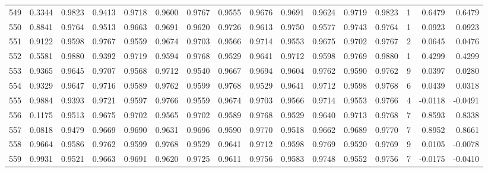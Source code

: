 \begin{tabular}{lrrrrrrrrrrrrrrr}
549 &      0.3344 &  0.9823 &  0.9413 &  0.9718 &  0.9600 &  0.9767 &  0.9555 &  0.9676 &  0.9691 &  0.9624 &   0.9719 &     0.9823 &      1 &                    0.6479 &                     0.6479 \\
550 &      0.8841 &  0.9764 &  0.9513 &  0.9663 &  0.9691 &  0.9620 &  0.9726 &  0.9613 &  0.9750 &  0.9577 &   0.9743 &     0.9764 &      1 &                    0.0923 &                     0.0923 \\
551 &      0.9122 &  0.9598 &  0.9767 &  0.9559 &  0.9674 &  0.9703 &  0.9566 &  0.9714 &  0.9553 &  0.9675 &   0.9702 &     0.9767 &      2 &                    0.0645 &                     0.0476 \\
552 &      0.5581 &  0.9880 &  0.9392 &  0.9719 &  0.9594 &  0.9768 &  0.9529 &  0.9641 &  0.9712 &  0.9598 &   0.9769 &     0.9880 &      1 &                    0.4299 &                     0.4299 \\
553 &      0.9365 &  0.9645 &  0.9707 &  0.9568 &  0.9712 &  0.9540 &  0.9667 &  0.9694 &  0.9604 &  0.9762 &   0.9590 &     0.9762 &      9 &                    0.0397 &                     0.0280 \\
554 &      0.9329 &  0.9647 &  0.9716 &  0.9589 &  0.9762 &  0.9599 &  0.9768 &  0.9529 &  0.9641 &  0.9712 &   0.9598 &     0.9768 &      6 &                    0.0439 &                     0.0318 \\
555 &      0.9884 &  0.9393 &  0.9721 &  0.9597 &  0.9766 &  0.9559 &  0.9674 &  0.9703 &  0.9566 &  0.9714 &   0.9553 &     0.9766 &      4 &                   -0.0118 &                    -0.0491 \\
556 &      0.1175 &  0.9513 &  0.9675 &  0.9702 &  0.9565 &  0.9702 &  0.9589 &  0.9768 &  0.9529 &  0.9640 &   0.9713 &     0.9768 &      7 &                    0.8593 &                     0.8338 \\
557 &      0.0818 &  0.9479 &  0.9669 &  0.9690 &  0.9631 &  0.9696 &  0.9590 &  0.9770 &  0.9518 &  0.9662 &   0.9689 &     0.9770 &      7 &                    0.8952 &                     0.8661 \\
558 &      0.9664 &  0.9586 &  0.9762 &  0.9599 &  0.9768 &  0.9529 &  0.9641 &  0.9712 &  0.9598 &  0.9769 &   0.9520 &     0.9769 &      9 &                    0.0105 &                    -0.0078 \\
559 &      0.9931 &  0.9521 &  0.9663 &  0.9691 &  0.9620 &  0.9725 &  0.9611 &  0.9756 &  0.9583 &  0.9748 &   0.9552 &     0.9756 &      7 &                   -0.0175 &                    -0.0410 \\

\end{tabular}
